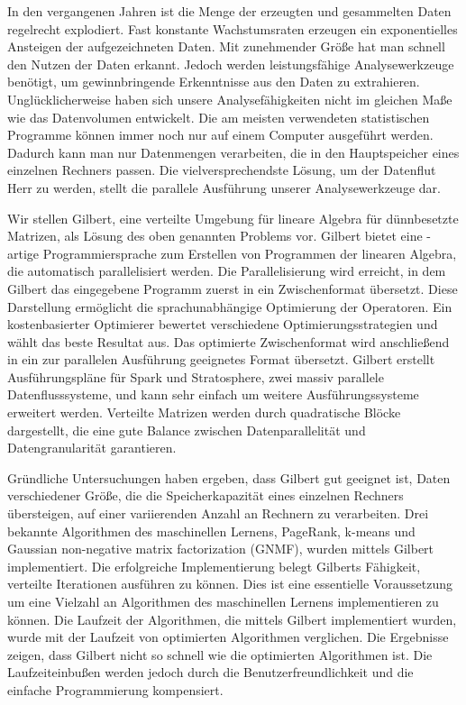 \clearemptydoublepage
{}
{}	


\vspace*{2cm}
\begin{center}
\end{center}
\vspace{1cm}

In den vergangenen Jahren ist die Menge der erzeugten und gesammelten Daten regelrecht explodiert.
Fast konstante Wachstumsraten erzeugen ein exponentielles Ansteigen der aufgezeichneten Daten.
Mit zunehmender Größe hat man schnell den Nutzen der Daten erkannt.
Jedoch werden leistungsfähige Analysewerkzeuge benötigt, um gewinnbringende Erkenntnisse aus den Daten zu extrahieren.
Unglücklicherweise haben sich unsere Analysefähigkeiten nicht im gleichen Maße wie das Datenvolumen entwickelt.
Die am meisten verwendeten statistischen Programme können immer noch nur auf einem Computer ausgeführt werden.
Dadurch kann man nur Datenmengen verarbeiten, die in den Hauptspeicher eines einzelnen Rechners passen.
Die vielversprechendste Lösung, um der Datenflut Herr zu werden, stellt die parallele Ausführung unserer Analysewerkzeuge dar.

Wir stellen Gilbert, eine verteilte Umgebung für lineare Algebra für dünnbesetzte Matrizen, als Lösung des oben genannten Problems vor.
Gilbert bietet eine \matlab-artige Programmiersprache zum Erstellen von Programmen der linearen Algebra, die automatisch parallelisiert werden.
Die Parallelisierung wird erreicht, in dem Gilbert das eingegebene Programm zuerst in ein Zwischenformat übersetzt.
Diese Darstellung ermöglicht die sprachunabhängige Optimierung der Operatoren.
Ein kostenbasierter Optimierer bewertet verschiedene Optimierungsstrategien und wählt das beste Resultat aus.
Das optimierte Zwischenformat wird anschließend in ein zur parallelen Ausführung geeignetes Format übersetzt.
Gilbert erstellt Ausführungspläne für Spark und Stratosphere, zwei massiv parallele Datenflusssysteme, und kann sehr einfach um weitere Ausführungssysteme erweitert werden. 
Verteilte Matrizen werden durch quadratische Blöcke dargestellt, die eine gute Balance zwischen Datenparallelität und Datengranularität garantieren.

Gründliche Untersuchungen haben ergeben, dass Gilbert gut geeignet ist, Daten verschiedener Größe, die die Speicherkapazität eines einzelnen Rechners übersteigen, auf einer variierenden Anzahl an Rechnern zu verarbeiten.
Drei bekannte Algorithmen des maschinellen Lernens, PageRank, k-means und Gaussian non-negative matrix factorization (GNMF), wurden mittels Gilbert implementiert.
Die erfolgreiche Implementierung belegt Gilberts Fähigkeit, verteilte Iterationen ausführen zu können.
Dies ist eine essentielle Voraussetzung um eine Vielzahl an Algorithmen des maschinellen Lernens implementieren zu können.
Die Laufzeit der Algorithmen, die mittels Gilbert implementiert wurden, wurde mit der Laufzeit von optimierten Algorithmen verglichen.
Die Ergebnisse zeigen, dass Gilbert nicht so schnell wie die optimierten Algorithmen ist.
Die Laufzeiteinbußen werden jedoch durch die Benutzerfreundlichkeit und die einfache Programmierung kompensiert.